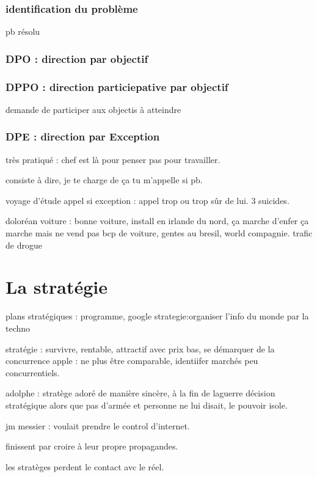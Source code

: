 \documentclass[a4paper,12pt]{article}
\begin{document}
 \subsubsection{identification du problème}
 
 pb résolu 
  \subsubsection{DPO  : direction par objectif}

  \subsubsection{ DPPO : direction particiepative par objectif}
demande de participer aux objectis à atteindre
 \subsubsection{DPE : direction par Exception}
 
 très pratiqué : chef est là pour penser pas pour travailler.
 
 consiste à dire, je te charge de ça tu m'appelle si pb.
 
 voyage d'étude appel si exception : appel trop ou trop sûr de lui.
 3 suicides.
 
 doloréan voiture : bonne voiture, install en irlande du nord, ça marche d'enfer
 ça marche mais ne vend pas bcp de voiture, gentes au bresil, world compagnie.
 trafic de drogue
 
 \section{La stratégie}
 
 plans stratégiques : programme, google strategie:organiser l'info du monde par la techno
 
 stratégie : survivre, rentable, attractif avec prix bas, se démarquer de la concurrence apple : ne plus être
 comparable, identiifer marchés peu concurrentiels.
 
 adolphe : stratège adoré de manière sincère, à la fin de laguerre décision stratégique alors que pas d'armée
 et personne ne lui disait, le pouvoir isole.
 
 jm messier : voulait prendre le control d'internet.
 
 finissent par croire à leur propre propagandes.
 
 les stratèges perdent le contact avc le réel.
 
\end{document}

